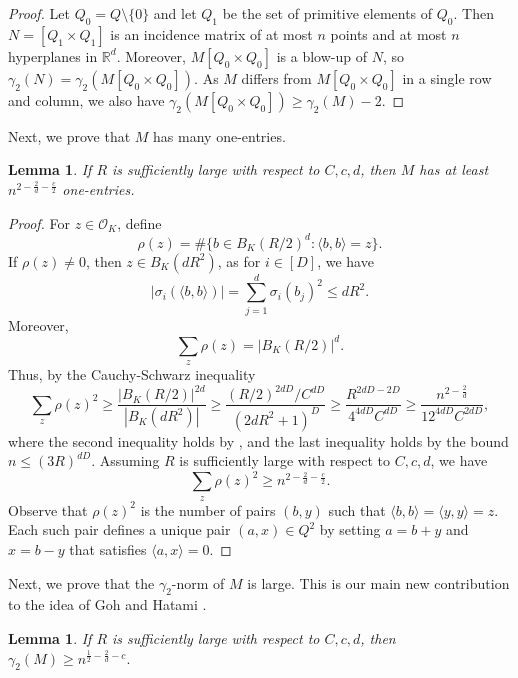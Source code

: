 \documentclass[11pt]{article}
\theoremstyle{plain}
\newtheorem{lemma}[theorem]{Lemma}
\theoremstyle{definition}
\begin{document}
    \begin{proof}
     Let $Q_0=Q\setminus \{0\}$ and let $Q_1$ be the set of primitive elements of $Q_0$. Then $N=[Q_1\times Q_1]$ is an incidence  matrix of at most $n$ points and at most $n$ hyperplanes in $\mathbb{R}^d$. Moreover, $M[Q_0\times Q_0]$ is a blow-up of $N$, so $\gamma_2(N)=\gamma_2(M[Q_0\times Q_0])$. As $M$ differs from $M[Q_0\times Q_0]$ in a single row and column, we also have $\gamma_2(M[Q_0\times Q_0])\geq \gamma_2(M)-2$.
    \end{proof}
	Next, we prove that $M$ has many one-entries.
	
	\begin{lemma}\label{lemma:num_one_entries}
		If $R$ is sufficiently large with respect to $C,c,d$, then $M$ has at least $n^{2-\frac{2}{d}-\frac{c}{2}}$ one-entries.
	\end{lemma}
	
	\begin{proof}
		For $z\in \mathcal{O}_K$, define
		$$\rho(z)=\# \{b\in B_K(R/2)^d : \langle b,b\rangle=z\}.$$
		If $\rho(z)\neq 0$, then $z\in B_K(d R^2)$, as for $i\in [D]$, we  have
		$$|\sigma_i(\langle b,b\rangle)|=\sum_{j=1}^d \sigma_i(b_j)^2\leq dR^2.$$
		Moreover, 
		$$\sum_{z}\rho(z)=|B_K(R/2)|^d.$$
		Thus, by the Cauchy-Schwarz inequality
		$$\sum_{z}\rho(z)^2\geq \frac{|B_K(R/2)|^{2d}}{|B_K(dR^2)|}\geq \frac{(R/2)^{2dD}/C^{dD}}{(2dR^2+1)^D}\geq \frac{R^{2dD-2D}}{4^{4dD}C^{dD}}\geq \frac{n^{2-\frac{2}{d}}}{12^{4dD}C^{2dD}},$$
		where the second inequality holds by , and the last inequality holds by the bound $n\leq (3R)^{dD}$.
		Assuming $R$ is sufficiently large with respect to $C,c,d$, we have
		$$\sum_{z}\rho(z)^2\geq n^{2-\frac{2}{d}-\frac{c}{2}}.$$
		Observe that $\rho(z)^2$ is the number of pairs $(b,y)$ such that $\langle b,b\rangle=\langle y,y\rangle=z$. Each such pair defines a unique pair $(a,x)\in Q^2$ by setting $a=b+y$ and $x=b-y$ that satisfies $\langle a,x\rangle=0$.
	\end{proof}
	
	Next, we prove that the $\gamma_2$-norm of $M$ is large. This is our main new contribution to the idea of Goh and Hatami \cite{GH_totally_real}.
	
	\begin{lemma}
		If $R$ is sufficiently large with respect to $C,c,d$, then $\gamma_2(M)\geq n^{\frac{1}{2}-\frac{2}{d}-c}.$
	\end{lemma}
	
\end{document}
